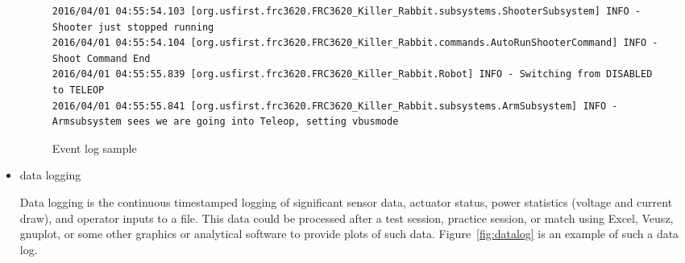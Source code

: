 \documentclass[]{article}
\begin{document}
\begin{itemize}[topsep=0pt]
\begin{figure}[h]
\begin{mdframed}
\begin{lstlisting}[basicstyle=\ttfamily\tiny]
2016/04/01 04:55:54.103 [org.usfirst.frc3620.FRC3620_Killer_Rabbit.subsystems.ShooterSubsystem] INFO - Shooter just stopped running
2016/04/01 04:55:54.104 [org.usfirst.frc3620.FRC3620_Killer_Rabbit.commands.AutoRunShooterCommand] INFO - Shoot Command End
2016/04/01 04:55:55.839 [org.usfirst.frc3620.FRC3620_Killer_Rabbit.Robot] INFO - Switching from DISABLED to TELEOP
2016/04/01 04:55:55.841 [org.usfirst.frc3620.FRC3620_Killer_Rabbit.subsystems.ArmSubsystem] INFO - Armsubsystem sees we are going into Teleop, setting vbusmode

\end{lstlisting}
\caption{Event log sample}
\label{fig:eventlog}
\end{mdframed}
\end{figure}

\item data logging

Data logging is the continuous timestamped logging of significant sensor data, actuator status, power statistics (voltage and current draw), and operator inputs to a file.
This data could be processed after a test session, practice session, or match using Excel, Veusz, gnuplot, or some other graphics or analytical software to provide plots of such data.
Figure~\ref{fig:datalog} is an example of such a data log.


\end{itemize}
\end{document}
